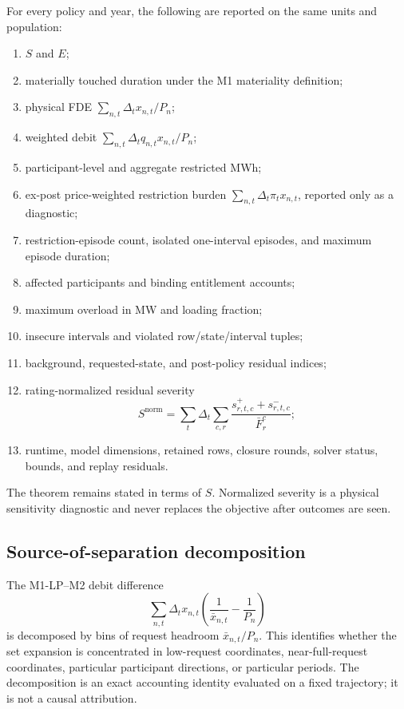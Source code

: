 \documentclass[10pt,journal,onecolumn]{IEEEtran}
\begin{document}
For every policy and year, the following are reported on the same units and
population:
\begin{enumerate}[leftmargin=*,itemsep=2pt]
\item $S$ and $E$;
\item materially touched duration under the M1 materiality definition;
\item physical FDE $\sum_{n,t}\Delta_tx_{n,t}/P_n$;
\item weighted debit $\sum_{n,t}\Delta_tq_{n,t}x_{n,t}/P_n$;
\item participant-level and aggregate restricted MWh;
\item ex-post price-weighted restriction burden
$\sum_{n,t}\Delta_t\pi_tx_{n,t}$, reported only as a diagnostic;
\item restriction-episode count, isolated one-interval episodes, and maximum
episode duration;
\item affected participants and binding entitlement accounts;
\item maximum overload in MW and loading fraction;
\item insecure intervals and violated row/state/interval tuples;
\item background, requested-state, and post-policy residual indices;
\item rating-normalized residual severity
\begin{equation}
S^{\mathrm{norm}}
=\sum_t\Delta_t\sum_{c,r}
\frac{s_{r,t,c}^{+}+s_{r,t,c}^{-}}{\bar F_r^c};
\end{equation}
\item runtime, model dimensions, retained rows, closure rounds, solver status,
bounds, and replay residuals.
\end{enumerate}
The theorem remains stated in terms of $S$. Normalized severity is a physical
sensitivity diagnostic and never replaces the objective after outcomes are
seen.

\subsection{Source-of-separation decomposition}

The M1-LP--M2 debit difference
\begin{equation}
\sum_{n,t}\Delta_tx_{n,t}
\left(\frac1{\bar x_{n,t}}-\frac1{P_n}\right)
\end{equation}
is decomposed by bins of request headroom
$\bar x_{n,t}/P_n$. This identifies whether the set expansion is concentrated
in low-request coordinates, near-full-request coordinates, particular
participant directions, or particular periods. The decomposition is an exact
accounting identity evaluated on a fixed trajectory; it is not a causal
attribution.
\end{document}
